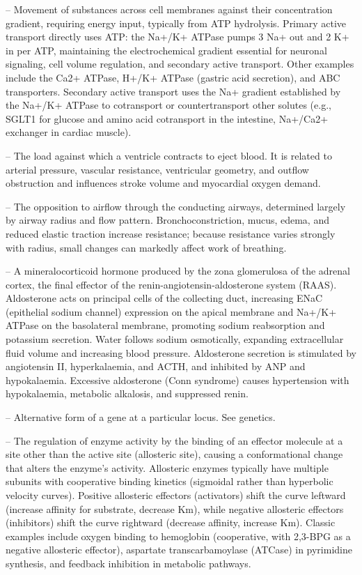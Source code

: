 -- Movement of substances across cell membranes against their concentration gradient, requiring energy input, typically from ATP hydrolysis. Primary active transport directly uses ATP: the Na+/K+ ATPase pumps 3 Na+ out and 2 K+ in per ATP, maintaining the electrochemical gradient essential for neuronal signaling, cell volume regulation, and secondary active transport. Other examples include the Ca2+ ATPase, H+/K+ ATPase (gastric acid secretion), and ABC transporters. Secondary active transport uses the Na+ gradient established by the Na+/K+ ATPase to cotransport or countertransport other solutes (e.g., SGLT1 for glucose and amino acid cotransport in the intestine, Na+/Ca2+ exchanger in cardiac muscle).

-- The load against which a ventricle contracts to eject blood. It is related to arterial pressure, vascular resistance, ventricular geometry, and outflow obstruction and influences stroke volume and myocardial oxygen demand.

-- The opposition to airflow through the conducting airways, determined largely by airway radius and flow pattern. Bronchoconstriction, mucus, edema, and reduced elastic traction increase resistance; because resistance varies strongly with radius, small changes can markedly affect work of breathing.

-- A mineralocorticoid hormone produced by the zona glomerulosa of the adrenal cortex, the final effector of the renin-angiotensin-aldosterone system (RAAS). Aldosterone acts on principal cells of the collecting duct, increasing ENaC (epithelial sodium channel) expression on the apical membrane and Na+/K+ ATPase on the basolateral membrane, promoting sodium reabsorption and potassium secretion. Water follows sodium osmotically, expanding extracellular fluid volume and increasing blood pressure. Aldosterone secretion is stimulated by angiotensin II, hyperkalaemia, and ACTH, and inhibited by ANP and hypokalaemia. Excessive aldosterone (Conn syndrome) causes hypertension with hypokalaemia, metabolic alkalosis, and suppressed renin.

-- Alternative form of a gene at a particular locus. See genetics.

-- The regulation of enzyme activity by the binding of an effector molecule at a site other than the active site (allosteric site), causing a conformational change that alters the enzyme's activity. Allosteric enzymes typically have multiple subunits with cooperative binding kinetics (sigmoidal rather than hyperbolic velocity curves). Positive allosteric effectors (activators) shift the curve leftward (increase affinity for substrate, decrease Km), while negative allosteric effectors (inhibitors) shift the curve rightward (decrease affinity, increase Km). Classic examples include oxygen binding to hemoglobin (cooperative, with 2,3-BPG as a negative allosteric effector), aspartate transcarbamoylase (ATCase) in pyrimidine synthesis, and feedback inhibition in metabolic pathways.

